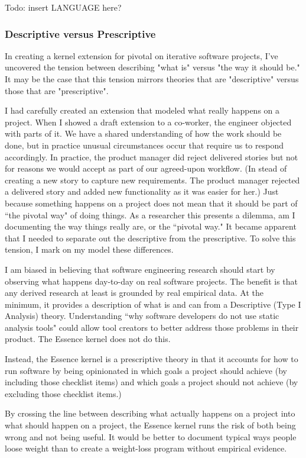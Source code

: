 \documentclass[preprint,12pt,3p]{elsarticle}
\begin{document}
{Todo: insert LANGUAGE here?

\subsubsection{Descriptive versus Prescriptive}

In creating a kernel extension for pivotal on iterative software projects, I've uncovered the tension between describing "what is" versus "the way it should be." It may be the case that this tension mirrors theories that are "descriptive" versus those that are "prescriptive". 

I had carefully created an extension that modeled what really happens on a project.  When I showed a draft extension to a co-worker, the engineer objected with parts of it. We have a shared understanding of how the work should be done, but in practice unusual circumstances occur that require us to respond accordingly. In practice, the product manager did reject delivered stories but not for reasons we would accept as part of our agreed-upon workflow. (In stead of creating a new story to capture new requirements. The product manager rejected a delivered story and added new functionality as it was easier for her.) Just because something happens on a project does not mean that it should be part of ``the pivotal way" of doing things. As a researcher this presents a dilemma, am I documenting the way things really are, or the ``pivotal way."  It became apparent that I needed to separate out the descriptive from the  prescriptive. To solve this tension, I mark on my model these differences. 

I am biased in believing that software engineering research should start by observing what happens day-to-day on real software projects. The benefit is that any derived research at least is grounded by real empirical data. At the minimum, it provides a description of what is and can from a Descriptive (Type I Analysis) theory. Understanding ``why software developers do not use static analysis tools" \cite{Johnson2013} could allow tool creators to better address those problems in their product. The Essence kernel does not do this. 

Instead, the Essence kernel is a prescriptive theory in that it accounts for how to run software by being opinionated in which goals a project should achieve (by including those checklist items) and which goals a project should not achieve (by excluding those checklist items.)

By crossing the line between describing what actually happens on a project into what should happen on a project, the Essence kernel runs the risk of both being wrong and not being useful.  It would be better to document typical ways people loose weight than to create a weight-loss program without empirical evidence. 

}
\end{document}
